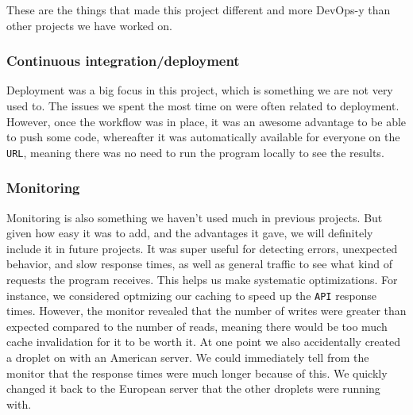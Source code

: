 These are the things that made this project different and more DevOps-y
than other projects we have worked on.

\subsubsection{Continuous integration/deployment}

Deployment was a big focus in this project, 
which is something we are not very used to.
The issues we spent the most time on were often related to deployment.
However, once the workflow was in place, it was
an awesome advantage to be able to push some code,
whereafter it was automatically available for everyone on the \texttt{URL}, 
meaning there was no need to run the program locally to see the results.

\subsubsection{Monitoring}

Monitoring is also something we haven't used much in previous projects.
But given how easy it was to add, and the advantages it gave,
we will definitely include it in future projects.
It was super useful for detecting errors, unexpected behavior,
and slow response times, as well as general traffic to see 
what kind of requests the program receives.
This helps us make systematic optimizations. For instance,
we considered optmizing our caching to speed up the \texttt{API} response times.
However, the monitor revealed that the number of writes were
greater than expected compared to the number of reads,
meaning there would be too much cache invalidation for it to be worth it.
At one point we also accidentally created a droplet on with an American server.
We could immediately tell from the monitor that the response 
times were much longer because of this.
We quickly changed it back to the European server 
that the other droplets were running with.